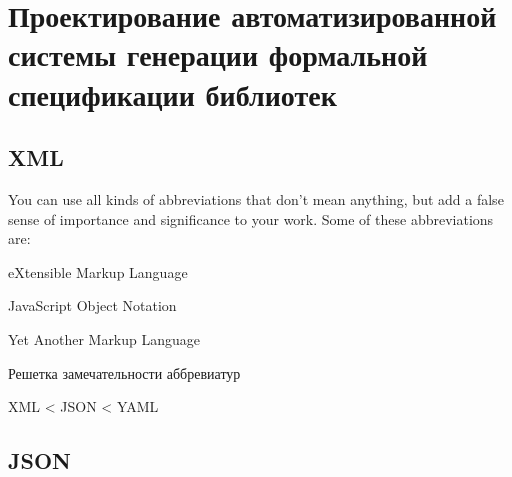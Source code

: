 \chapter{Проектирование автоматизированной системы генерации формальной спецификации библиотек}


\section{XML}

\blindtext

You can use all kinds of abbreviations that don't mean anything, but add
a false sense of importance and significance to your work. Some of these
abbreviations are:
%
\begin{itemize*}
\item eXtensible Markup Language
\item JavaScript Object Notation
\item Yet Another Markup Language
\end{itemize*}
%

\begin{table}
\captionsetup{skip=5pt}
\caption{Решетка замечательности аббревиатур}
\centering
XML < JSON < YAML
\end{table}

\Blindtext

\section{JSON}

\Blindtext
